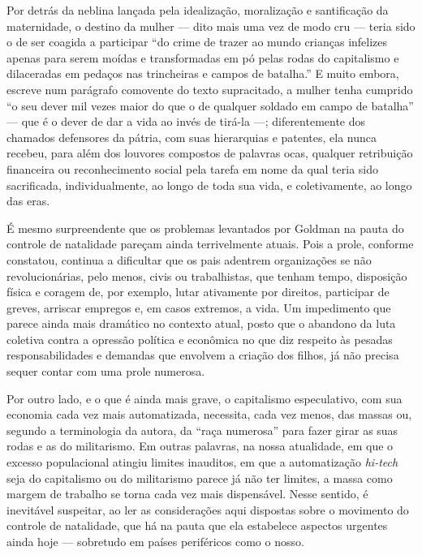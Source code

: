 Por detrás da neblina
lançada pela idealização, moralização e santificação da maternidade, o
destino da mulher --- dito mais uma vez de modo cru --- teria sido o de
ser coagida a participar ``do crime de trazer ao mundo crianças
infelizes apenas para serem moídas e transformadas em pó pelas rodas do
capitalismo e dilaceradas em pedaços nas trincheiras e campos de
batalha.'' E muito embora, escreve num parágrafo comovente do texto
supracitado, a mulher tenha cumprido ``o seu dever mil vezes maior do
que o de qualquer soldado em campo de batalha'' --- que é o dever de dar
a vida ao invés de tirá-la ---; diferentemente dos chamados defensores da
pátria, com suas hierarquias e patentes, ela nunca recebeu, para além
dos louvores compostos de palavras ocas, qualquer retribuição financeira
ou reconhecimento social pela tarefa em nome da qual teria sido
sacrificada, individualmente, ao longo de toda sua vida, e
coletivamente, ao longo das eras.

É mesmo surpreendente que os problemas levantados por Goldman na pauta
do controle de natalidade pareçam ainda terrivelmente atuais. Pois a
prole, conforme constatou, continua a dificultar que os pais
adentrem organizações se não revolucionárias, pelo menos, civis ou
trabalhistas, que tenham tempo, disposição física e coragem de, por
exemplo, lutar ativamente por direitos, participar de greves, arriscar
empregos e, em casos extremos, a vida. Um impedimento que parece ainda
mais dramático no contexto atual, posto que o abandono da luta coletiva
contra a opressão política e econômica no que diz respeito às pesadas
responsabilidades e demandas que envolvem a criação dos filhos, já não
precisa sequer contar com uma prole numerosa. 

Por outro lado, e o que é
ainda mais grave, o capitalismo especulativo, com sua economia cada vez
mais automatizada, necessita, cada vez menos, das massas ou, segundo a
terminologia da autora, da ``raça numerosa'' para fazer girar as suas
rodas e as do militarismo. Em outras palavras, na nossa atualidade, em
que o excesso populacional atingiu limites inauditos, em que a
automatização \textit{hi-tech} seja do capitalismo ou do militarismo parece
já não ter limites, a massa como margem de trabalho se torna cada vez
mais dispensável. Nesse sentido, é inevitável suspeitar, ao ler as
considerações aqui dispostas sobre o movimento do controle de
natalidade, que há na pauta que ela estabelece aspectos urgentes ainda
hoje --- sobretudo em países periféricos como o nosso. 


